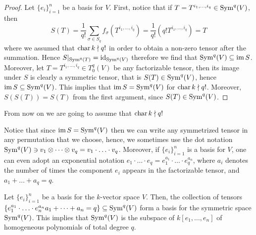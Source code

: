 \begin{proof}
Let \(\{e_i\}_{i=1}^n\) be a basis for \(V\). First, notice that if \(T =
T^{i_1, \dots, i_q} \in \operatorname{Sym}^q(V)\),
then
\[
  S(T) = \frac{1}{q!} \sum_{\sigma \in S_q} f_\sigma(T^{i_1, \dots,
  i_q}) = \frac{1}{q!} (q! T^{i_1, \dots, i_q}) = T
\]
where we assumed that \(\operatorname{char} k \nmid q!\) in order to obtain a non-zero tensor
after the summation. Hence \(S|_{\operatorname{Sym}^q(T)} = \operatorname{id}_{\operatorname{Sym}^q(V)}\) therefore we
find that \(\operatorname{Sym}^q(V) \subseteq \operatorname{im} S\). Moreover, let \(T = T^{i_1, \dots,
i_q} \in T_0^q(V)\) be any factorizable tensor, then its image under \(S\) is
clearly a symmetric tensor, that is \(S(T) \in \operatorname{Sym}^q(V)\), hence \(\operatorname{im} S
\subseteq \operatorname{Sym}^q(V)\). This implies that \(\operatorname{im} S = \operatorname{Sym}^q(V)\) for \(\operatorname{char} k
\nmid q!\). Moreover, \(S(S(T)) = S(T)\) from the first argument, since
\(S(T) \in \operatorname{Sym}^q(V)\).
\end{proof}

\begin{remark}
From now on we are going to assume that \(\operatorname{char} k \nmid q!\)
\end{remark}

\begin{notation}
Notice that since \(\operatorname{im} S = \operatorname{Sym}^q(V)\) then we can write any symmetrized
tensor in any permutation that we choose, hence, we sometimes use the dot
notation \(\operatorname{Sym}^q(V) \ni v_1 \otimes \dots \otimes v_q = v_1 \cdot \ldots
\cdot v_q\). Moreover, if \(\{e_i\}_{i=1}^n\) is a basis for \(V\), one can
even adopt an exponential notation \(e_1 \cdot \ldots \cdot e_q = e_1^{a_1}
\cdot \ldots \cdot e_q^{a_n}\), where \(a_i\) denotes the number of times the
component \(e_i\) appears in the factorizable tensor, and \(a_1 + \dots + a_q
= q\).
\end{notation}

\begin{proposition}
\label{prop: basis for symmetric power}
Let \(\{e_i\}_{i=1}^n\) be a basis for the \(k\)-vector space \(V\). Then, the
collection of tensors \(\{e_1^{a_1} \cdot \ldots \cdot e_n^{a_n} \relax a_1 + \dots
+ a_n = q\} \subseteq \operatorname{Sym}^q(V)\) form a basis for the symmetric space
\(\operatorname{Sym}^q(V)\). This implies that \(\operatorname{Sym}^q(V)\) is the subspace of \(k[e_1,
\dots, e_n]\) of homogeneous polynomials of total degree \(q\).
\end{proposition}

